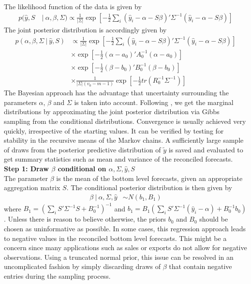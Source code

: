 \documentclass[a4paper,fleqn,11pt]{article}
\begin{document}
The likelihood function of the data is given by
\begin{align*}
p(\hat{y},S\ &|\ \alpha,\beta,\Sigma) \propto \frac{1}{|\Sigma|} \exp\left[-\frac{1}{2} \sum_i  (\hat{y}_i - \alpha - S\beta)'\Sigma^{-1}(\hat{y}_i - \alpha - S\beta)\right]
\end{align*}
The joint posterior distribution is accordingly given by
\begin{align*}
p(\alpha,\beta,\Sigma\ |\ \hat{y},S) & \propto \frac{1}{|\Sigma|} \exp\left[-\frac{1}{2} \sum_i  (\hat{y}_i - \alpha - S\beta)'\Sigma^{-1}(\hat{y}_i - \alpha - S\beta)\right] \\
&\times \exp \left[-\frac{1}{2}(\alpha - a_0)'A_0^{-1}(\alpha - a_0)\right] \\
&\times \exp \left[-\frac{1}{2}(\beta - b_0)'B_0^{-1}(\beta - b_0)\right] \\
&\times \frac{1}{|\Sigma|(v_0 - m - 1)} \exp \left[-\frac{1}{2} tr(R_0^{-1}\Sigma^{-1}) \right]
\end{align*}
The Bayesian approach has the advantage that uncertainty surrounding the parameters $\alpha$, $\beta$ and $\Sigma$ is taken into account. Following \cite{Percy1992}, we get the marginal distributions by approximating the joint posterior distribution via Gibbs sampling from the conditional distributions.  Convergence is usually achieved very quickly, irrespective of the starting values. It can be verified by testing for stability in the recursive means of the Markov chains. A sufficiently large sample of draws from the posterior predictive distribution of $\tilde{y}$ is saved and evaluated to get summary statistics such as mean and variance of the reconciled forecasts.\\

\noindent\textbf{Step 1: Draw $\beta$ conditional on $\alpha,\Sigma,\hat{y},S$}\\
The parameter $\beta$ is the mean of the bottom level forecasts, given an appropriate aggregation matrix $S$. The conditional posterior distribution is then given by
\begin{align}
\beta\ |\ \alpha,\Sigma,\hat{y} &\sim N(b_1,B_1)
\end{align}
where $B_1 = \left(\sum_i S'\Sigma^{-1}S + B_0^{-1}\right)^{-1}$ and $b_1 = B_1 \left(\sum_i S'\Sigma^{-1} (\hat{y}_i - \alpha) + B_0^{-1}b_0\right)$. Unless there is reason to believe otherwise, the priors $b_0$ and $B_0$ should be chosen as uninformative as possible. In some cases, this regression approach leads to negative values in the reconciled bottom level forecasts. This might be a concern since many applications such as sales or exports do not allow for negative observations. Using a truncated normal prior, this issue can be resolved in an uncomplicated fashion by simply discarding draws of $\beta$ that contain negative entries during the sampling process.\\
\end{document}
